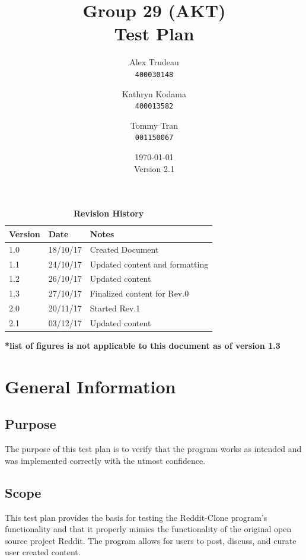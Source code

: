 \documentclass[12pt,fleqn]{article}
\title{Group 29 (AKT)\\ Test Plan}
\author{
Alex Trudeau\\
	\texttt{400030148}
\and
Kathryn Kodama\\
  	\texttt{400013582}
\and
Tommy Tran\\
	\texttt{001150067}
}
\date{\today\\Version 2.1}
\begin{document}
\maketitle



\pagebreak


\tableofcontents

\listoftables

\begin{table}[ht]
\caption{\bf Revision History}
\begin{tabularx}{\textwidth}{p{3cm}p{2cm}X}
\toprule {\bf Version} & {\bf Date} & {\bf Notes}\\
\midrule
1.0 & 18/10/17 & Created Document\\
1.1 & 24/10/17 & Updated  content and formatting\\
1.2 & 26/10/17 & Updated content\\
1.3 & 27/10/17 & Finalized content for Rev.0 \\
2.0 & 20/11/17 & Started Rev.1 \\
2.1 & 03/12/17 & Updated content\\
\bottomrule
\end{tabularx}
\textbf{*list of figures is not applicable to this document as of version 1.3}
\end{table}



\clearpage



\section {General Information}

\subsection {Purpose}
The purpose of this test plan is to verify that the program works as intended and was implemented correctly with the utmost confidence.

\subsection {Scope}
This test plan provides the basis for testing the Reddit-Clone program's functionality and that it properly mimics the functionality of the original open source project Reddit.  The program allows for users to post, discuss, and curate user created content.
\end{document}
